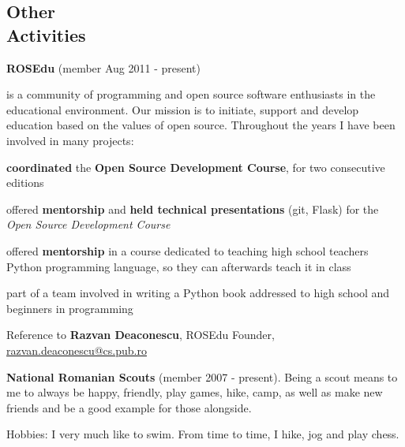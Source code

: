 \documentclass[margin,line]{resume}
\begin{document}
\begin{resume}

    \section{\mysidestyle Other\\Activities}

    \textbf{ROSEdu} (member Aug 2011 - present)
    {\fontsize{2.65mm}{1em}\selectfont
      is a community of
      programming and open source software enthusiasts in the educational environment. Our mission is to
      initiate, support and develop education based on the values of open source.\vspace{1mm}
      Throughout the years I have been involved in many projects:
      \begin{list2}
          \item \textbf{coordinated} the \textbf{Open Source Development Course}, for two consecutive editions
          \item offered \textbf{mentorship} and \textbf{held technical presentations} (git, Flask) for the \textit{Open Source Development Course}
          \item offered \textbf{mentorship} in a course dedicated to teaching high school teachers Python programming language, so they can afterwards teach it in class
          \item part of a team involved in writing a Python book addressed to high school and beginners in programming
      \end{list2}\vspace{-3.5mm}
      Reference to \textbf{Razvan Deaconescu}, ROSEdu Founder, \href{mailto:razvan.deaconescu@cs.pub.ro}{razvan.deaconescu@cs.pub.ro}
    }\vspace{-1mm}

	\textbf{National Romanian Scouts} (member 2007 - present).
    {\fontsize{2.65mm}{1em}\selectfont
      Being a scout means to me to always be happy, friendly, play games, hike, camp, as well as make new friends and be a good example for those alongside.
    }\vspace{-1mm}

	Hobbies: I very much like to swim. From time to time, I hike, jog and play chess.



\end{resume}
\end{document}
